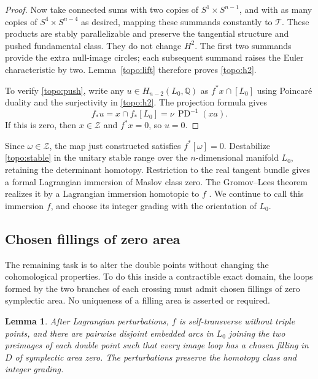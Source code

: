 \documentclass[11pt]{article}
\numberwithin{equation}{section}
\newtheorem{lemma}[theorem]{Lemma}
\theoremstyle{definition}
\theoremstyle{remark}
\begin{document}
\begin{proof}
Now take connected sums with two copies of $S^1\times S^{n-1}$,
and with as many copies of $S^4\times S^{n-4}$ as desired, mapping
these summands constantly to $\mathscr T$.  These products are
stably parallelizable and preserve the tangential structure and
pushed fundamental class.  They do not change $H^2$.  The first
two summands provide the extra null-image circles; each subsequent
summand raises the Euler characteristic by two.  Lemma~\ref{topo:lift}
therefore proves \eqref{topo:h2}.

To verify \eqref{topo:push}, write any $u\in H_{n-2}(L_0,\mathbb Q)$ as
$f^*x\cap[L_0]$ using Poincar\'e duality and the surjectivity in
\eqref{topo:h2}.  The projection formula gives
\[
 f_*u=x\cap f_*[L_0]=\nu\,\operatorname{PD}^{-1}(xa).
\]
If this is zero, then $x\in\mathcal Z$ and $f^*x=0$, so $u=0$.
\end{proof}

Since $\omega\in\mathcal Z$, the map just constructed satisfies
$f^*[\omega]=0$.  Destabilize \eqref{topo:stable} in the unitary
stable range over the $n$-dimensional manifold $L_0$, retaining the
determinant homotopy.  Restriction to the real tangent bundle gives
a formal Lagrangian immersion of Maslov class zero.  The
Gromov--Lees theorem realizes it by a Lagrangian immersion homotopic
to $f$ \cite{GromovLees,RathelFournier2024}.  We continue to call
this immersion $f$, and choose its integer grading with the
orientation of $L_0$.

\subsection{Chosen fillings of zero area}

The remaining task is to alter the double points without changing
the cohomological properties.  To do this inside a contractible
exact domain, the loops formed by the two branches of each crossing
must admit chosen fillings of zero symplectic area.  No uniqueness
of a filling area is asserted or required.

\begin{lemma}\label{topo:zero-actions}
After Lagrangian perturbations, $f$ is self-transverse without triple
points, and there are pairwise disjoint embedded arcs in $L_0$
joining the two preimages of each double point such that every
image loop has a chosen filling in $D$ of symplectic area zero.
The perturbations preserve the homotopy class and integer grading.
\end{lemma}
\end{document}
